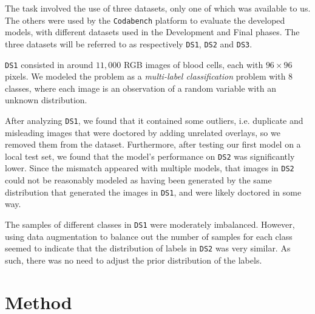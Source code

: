 \documentclass[11pt]{article}
\begin{document}
\begin{multicols}{2}

      The task involved the use of three datasets, only one of which was available to us. The others were used by the \texttt{Codabench}\cite{codabench} platform to evaluate the developed models, with different datasets used in the Development and Final phases. The three datasets will be referred to as respectively \texttt{DS1}, \texttt{DS2} and \texttt{DS3}.

      \texttt{DS1} consisted in around $11,000$ RGB images of blood cells, each with $96 \times 96$ pixels. We modeled the problem as a \textit{multi-label classification} problem with $8$ classes, where each image is an observation of a random variable with an unknown distribution.
      
      After analyzing \texttt{DS1}, we found that it contained some outliers, i.e. duplicate and misleading images that were doctored by adding unrelated overlays, so we removed them from the dataset. Furthermore, after testing our first model on a local test set, we found that the model's performance on \texttt{DS2} was significantly lower. Since the mismatch appeared with multiple models, that images in \texttt{DS2} could not be reasonably modeled as having been generated by the same distribution that generated the images in \texttt{DS1}, and were likely doctored in some way.

      The samples of different classes in \texttt{DS1} were moderately imbalanced. However, using data augmentation to balance out the number of samples for each class seemed to indicate that the distribution of labels in \texttt{DS2} was very similar. As such, there was no need to adjust the prior distribution of the labels.

      \section{Method}


\end{multicols}
\end{document}
